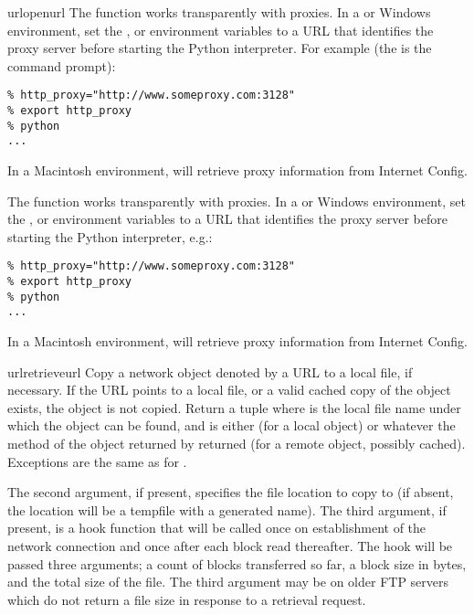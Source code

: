 \begin{funcdesc}{urlopen}{url}
The  function works transparently with proxies.
In a \UNIX{} or Windows environment, set the ,
 or  environment variables to a
URL that identifies the proxy server before starting the Python
interpreter.  For example (the \character{\%} is the command prompt):

\begin{verbatim}
% http_proxy="http://www.someproxy.com:3128"
% export http_proxy
% python
...
\end{verbatim}

In a Macintosh environment,  will retrieve proxy
information from Internet Config.

The  function works transparently with proxies.
In a \UNIX{} or Windows environment, set the ,
 or  environment variables to a
URL that identifies the proxy server before starting the Python
interpreter, e.g.:

\begin{verbatim}
% http_proxy="http://www.someproxy.com:3128"
% export http_proxy
% python
...
\end{verbatim}

In a Macintosh environment,  will retrieve proxy
information from Internet Config.
\end{funcdesc}

\begin{funcdesc}{urlretrieve}{url}
Copy a network object denoted by a URL to a local file, if necessary.
If the URL points to a local file, or a valid cached copy of the
object exists, the object is not copied.  Return a tuple
 where  is the
local file name under which the object can be found, and 
is either  (for a local object) or whatever the
 method of the object returned by 
returned (for a remote object, possibly cached).  Exceptions are the
same as for .

The second argument, if present, specifies the file location to copy
to (if absent, the location will be a tempfile with a generated name).
The third argument, if present, is a hook function that will be called
once on establishment of the network connection and once after each
block read thereafter.  The hook will be passed three arguments; a
count of blocks transferred so far, a block size in bytes, and the
total size of the file.  The third argument may be  on older
FTP servers which do not return a file size in response to a retrieval 
request.
\end{funcdesc}

